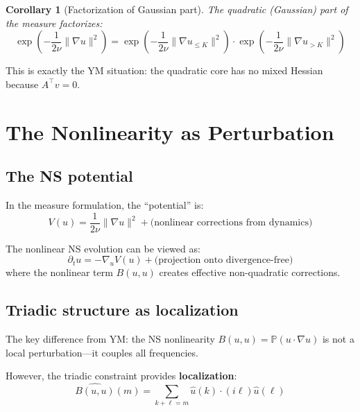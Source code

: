 \documentclass[11pt]{article}
\newtheorem{corollary}[theorem]{Corollary}
\theoremstyle{definition}
\begin{document}
\begin{corollary}[Factorization of Gaussian part]
The quadratic (Gaussian) part of the measure factorizes:
\begin{equation}
\exp\left(-\frac{1}{2\nu}\|\nabla u\|^2\right) = 
\exp\left(-\frac{1}{2\nu}\|\nabla u_{\leq K}\|^2\right) \cdot 
\exp\left(-\frac{1}{2\nu}\|\nabla u_{>K}\|^2\right)
\end{equation}
\end{corollary}

This is exactly the YM situation: the quadratic core has no mixed Hessian because $A^\top v = 0$.

\section{The Nonlinearity as Perturbation}

\subsection{The NS potential}

In the measure formulation, the ``potential'' is:
\begin{equation}
V(u) = \frac{1}{2\nu}\|\nabla u\|^2 + \text{(nonlinear corrections from dynamics)}
\end{equation}

The nonlinear NS evolution can be viewed as:
\begin{equation}
\partial_t u = -\nabla_u V(u) + \text{(projection onto divergence-free)}
\end{equation}
where the nonlinear term $B(u,u)$ creates effective non-quadratic corrections.

\subsection{Triadic structure as localization}

The key difference from YM: the NS nonlinearity $B(u,u) = \mathbb{P}(u \cdot \nabla u)$ is not 
a local perturbation---it couples all frequencies.

However, the triadic constraint provides \textbf{localization}:
\begin{equation}
\widehat{B(u,u)}(m) = \sum_{k+\ell=m} \hat{u}(k) \cdot (i\ell) \hat{u}(\ell)
\end{equation}
\end{document}
